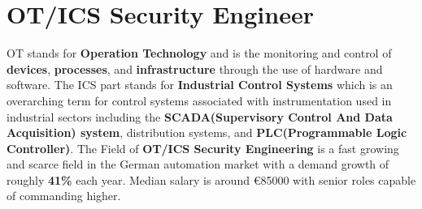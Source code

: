 \section{OT/ICS Security Engineer}
OT stands for  \textbf{Operation Technology} and is the monitoring and control of
\textbf{devices},  \textbf{processes}, and  \textbf{infrastructure} through the use of hardware
and software. The ICS part stands for   \textbf{Industrial Control Systems} which is an
overarching term for control systems associated with instrumentation used in industrial sectors
including  the \textbf{SCADA(Supervisory Control And Data Acquisition) system}, distribution
systems, and \textbf{PLC(Programmable Logic Controller)}. The Field of  \textbf{OT/ICS Security
  Engineering} is a fast growing and scarce field in the German automation market with a demand
growth of roughly \textbf{41\%} each year. Median salary is around \euro 85000 with senior roles
capable of commanding higher.

